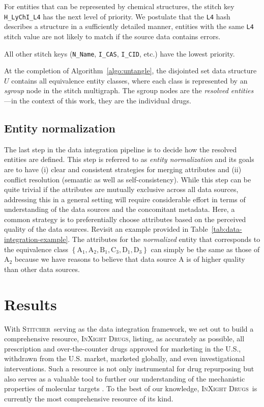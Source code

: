 \documentclass{bmcart}
\newcommand\st{\textsc{Stitcher}}
\newcommand\ix{\textsc{InXight Drugs}}
\begin{document}
For entities that can be represented by chemical structures, the
stitch key \texttt{H\_LyChI\_L4} has the next level of priority. We
postulate that the \texttt{L4} hash describes a structure in a
sufficiently detailed manner, entities with the same \texttt{L4}
stitch value are not likely to match if the source data contains
errors. 

All other stitch keys (\texttt{N\_Name}, \texttt{I\_CAS},
\texttt{I\_CID}, etc.) have the lowest priority.

At the completion of Algorithm~\ref{algo:untangle}, the disjointed set
data structure $U$ contains all equivalence entity classes, where each class 
is represented by an \emph{sgroup} node in the stitch multigraph. 
The sgroup nodes are the \emph{resolved entities}---in the context of
this work, they are the individual drugs.

\subsection*{Entity normalization}
The last step in the data integration pipeline is to decide how the
resolved entities are defined. This step is referred to as \emph{entity
normalization} and its goals are to have (i) clear and consistent
strategies for merging attributes and (ii) conflict resolution
(semantic as well as self-consistency). While this step can be quite
trivial if the attributes are mutually exclusive across all data
sources, addressing this in a general setting will require considerable
effort in terms of understanding of the data sources and the
concomitant metadata. Here, a common strategy is to preferentially
choose attributes based on the perceived quality of the data sources.
Revisit an example provided in Table~\ref{tab:data-integration-example}.
The attributes for the \emph{normalized} entity that corresponds to
the equivalence class $\left\{\textrm{A}_1, \textrm{A}_2, \textrm{B}_1,
\textrm{C}_3, \textrm{D}_1, \textrm{D}_3\right\}$ can simply be the
same as those of $\textrm{A}_2$ because we have reasons to believe
that data source A is of higher quality than other data sources.

\section*{Results}
With \st\ serving as the data integration framework, we set out to
build a comprehensive resource, \ix, listing, as accurately as
possible, all prescription and over-the-counter drugs approved for
marketing in the U.S., withdrawn from the U.S. market, marketed
globally, and even investigational interventions. Such a resource is
not only instrumental for drug repurposing but also serves as a
valuable tool to further our understanding of the mechanistic
properties of molecular targets \cite{Huang2011,Huang2019}. To the
best of our knowledge, \ix\ is currently the most comprehensive
resource of its kind. 
\end{document}
